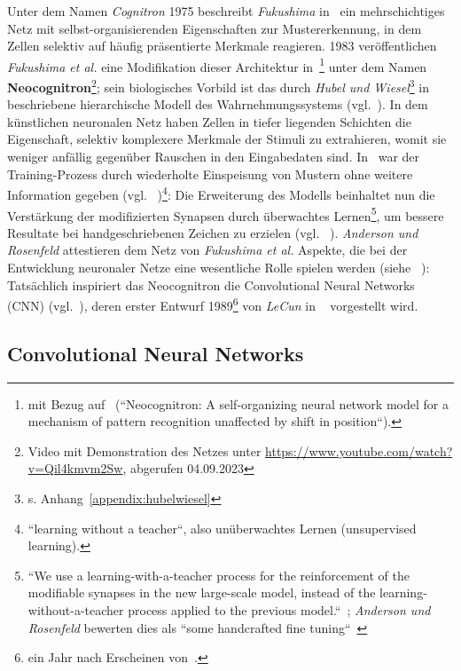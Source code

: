 Unter dem Namen \textit{Cognitron} 1975 beschreibt \textit{Fukushima} in~\cite{Fuk75} ein mehrschichtiges Netz mit selbst-organisierenden Eigenschaften zur Mustererkennung, in dem Zellen selektiv auf häufig präsentierte Merkmale reagieren.
1983 veröffentlichen \textit{Fukushima et al.} eine Modifikation dieser Architektur in~\cite{FMI83}\footnote{
    mit Bezug auf~\cite{Fuk80} (``Neocognitron: A self-organizing neural network model for a mechanism of pattern recognition unaffected by shift in position``).
} unter dem Namen \textbf{Neocognitron}\footnote{
    Video mit Demonstration des Netzes unter \url{https://www.youtube.com/watch?v=Qil4kmvm2Sw}, abgerufen 04.09.2023
}; sein biologisches Vorbild ist das durch \textit{Hubel und Wiesel}\footnote{s. Anhang~\ref{appendix:hubelwiesel}} in~\cite{HW62} beschriebene hierarchische Modell des Wahrnehmungssystems (vgl.~\cite[827]{FMI83}).
In dem künstlichen neuronalen Netz haben Zellen in tiefer liegenden Schichten die Eigenschaft, selektiv komplexere Merkmale der Stimuli zu extrahieren, womit sie weniger anfällig gegenüber Rauschen in den Eingabedaten sind.
In~\cite{Fuk80} war der Training-Prozess durch wiederholte Einspeisung von Mustern ohne weitere Information gegeben (vgl. ~\cite[197]{Fuk80})\footnote{
    ``learning without a teacher``, also unüberwachtes Lernen (unsupervised learning).
}: Die Erweiterung des Modells beinhaltet nun die Verstärkung der modifizierten Synapsen durch überwachtes Lernen\footnote{
    ``We use a learning-with-a-teacher process for the reinforcement of the modifiable synapses in the new large-scale
model, instead of the learning-without-a-teacher process applied to the previous model.``~\cite[827]{FMI83}; \textit{Anderson und Rosenfeld} bewerten dies als ``some handcrafted fine tuning``~\cite[524 f.]{AR88}
}, um bessere Resultate bei handgeschriebenen Zeichen zu erzielen (vgl. ~\cite[829]{FMI83}).
\textit{Anderson und Rosenfeld} attestieren dem Netz von \textit{Fukushima et al.} Aspekte, die bei der Entwicklung neuronaler Netze eine wesentliche Rolle spielen werden (siehe ~\cite[524]{AR88}):  Tatsächlich inspiriert das Neocognitron die Convolutional Neural Networks (CNN) (vgl.~\cite[439]{LBH15}), deren erster Entwurf 1989\footnote{
    ein Jahr nach Erscheinen von~\cite{AR88}.
} von \textit{LeCun} in ~\cite{Cun89} vorgestellt wird.



\subsection{Convolutional Neural Networks}\label{cnn}

